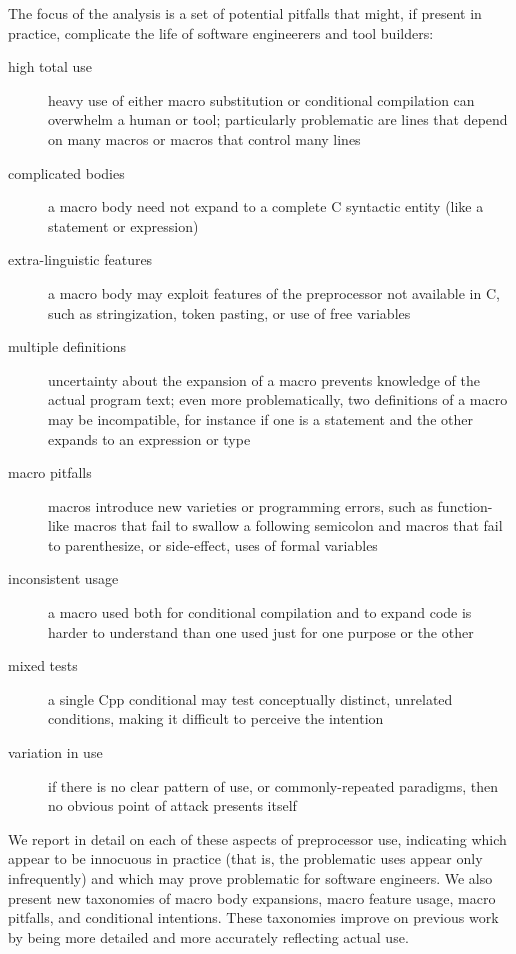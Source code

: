 \documentclass[10pt]{article}
\begin{document}
The focus of the analysis is a set of potential pitfalls that might,
if present in practice, complicate the life of software engineerers
and tool builders:
\begin{description}
\item[high total use]  heavy use of either macro substitution or
  conditional compilation can overwhelm a human or tool; particularly
  problematic are lines that depend on many macros or macros that control
  many lines
\item[complicated bodies]  a macro body need not expand to a complete
  C syntactic entity (like a statement or expression)
\item[extra-linguistic features]  a macro body may exploit features of
  the preprocessor not available in C, such as stringization, token
  pasting, or use of free variables
\item[multiple definitions]  uncertainty about the expansion of a macro
  prevents knowledge of the actual program text; even more problematically,
  two definitions of a macro may be incompatible, for instance if one is a
  statement and the other expands to an expression or type
\item[macro pitfalls]  macros introduce new varieties or programming
  errors, such as function-like macros that fail to swallow a following
  semicolon and macros that fail to parenthesize, or side-effect, uses of
  formal variables
\item[inconsistent usage]  a macro used both for conditional
  compilation and to expand code is harder to understand than one used just
  for one purpose or the other
\item[mixed tests]  a single Cpp conditional may test conceptually
  distinct, unrelated conditions, making it difficult to perceive the
  intention
\item[variation in use]  if there is no clear pattern of use, or
  commonly-repeated paradigms, then no obvious point of attack presents
  itself
\end{description}
We report in detail on each of these aspects of preprocessor use,
indicating which appear to be innocuous in practice (that is, the
problematic uses appear only infrequently) and which may prove problematic
for software engineers.  We also present new taxonomies of macro body
expansions, macro feature usage, macro pitfalls, and conditional
intentions.  These taxonomies improve on previous work by being more
detailed and more accurately reflecting actual use.
\end{document}
